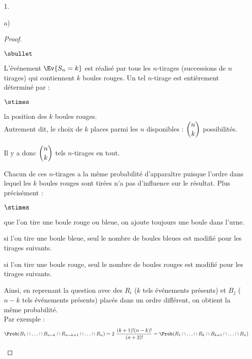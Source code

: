 \documentclass[11pt]{article}%
\begin{document}
\begin{noliste}{1.}
\begin{noliste}{a)}
    \begin{proof}~
      \begin{noliste}{$\sbullet$}
      \item L'événement $\Ev{S_n = k}$ est réalisé par tous les
        $n$-tirages (successions de $n$ tirages) qui contiennent $k$
        boules rouges. Un tel $n$-tirage est entièrement déterminé par :
        \begin{noliste}{$\stimes$}
        \item la position des $k$ boules rouges.\\
          Autrement dit, le choix de $k$ places parmi les $n$
          disponibles : $\dbinom{n}{k}$ possibilités.
        \end{noliste}
        Il y a donc $\dbinom{n}{k}$ tels $n$-tirages en tout.
      \item Chacun de ces $n$-tirages a la même probabilité
        d'apparaître puisque l'ordre dans lequel les $k$ boules rouges
        sont tirées n'a pas d'influence sur le résultat. Plus
        précisément :
        \begin{noliste}{$\stimes$}
        \item que l'on tire une boule rouge ou bleue, on ajoute
          toujours une boule dans l'urne.
        \item si l'on tire une boule bleue, seul le nombre de boules
          bleues est modifié pour les tirages suivants.
        \item si l'on tire une boule rouge, seul le nombre de boules
          rouges est modifié pour les tirages suivants.
        \end{noliste}
        Ainsi, en reprenant la question  avec des $R_i$
        ($k$ tels événements présents) et $B_j$ ($n-k$ tels événements
        présents) placés dans un ordre différent, on obtient la même
        probabilité.\\
        Par exemple :
        \[
        \Prob(B_1 \cap \ldots \cap B_{n-k} \cap R_{n-k+1} \cap \ldots
        \cap R_n) = 2 \ \dfrac{(k+1)! (n-k)!}{(n+2)!} = \Prob(R_1 \cap
        \ldots \cap R_{k} \cap B_{k+1} \cap \ldots \cap B_n)
        \]


\end{noliste}
\end{proof}
\end{noliste}
\end{noliste}
\end{document}
